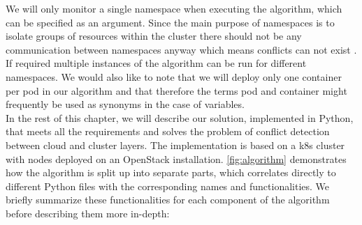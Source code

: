 We will only monitor a single namespace when executing the algorithm, which can be specified as an argument. Since the main purpose of namespaces is to isolate groups of resources within the cluster there should not be any communication between namespaces anyway which means conflicts can not exist \cite{namespace}. If required multiple instances of the algorithm can be run for different namespaces. We would also like to note that we will deploy only one container per pod in our algorithm and that therefore the terms pod and container might frequently be used as synonyms in the case of variables.
\\[10pt]

In the rest of this chapter, we will describe our solution, implemented in Python, that meets all the requirements and solves the problem of conflict detection between cloud and cluster layers. The implementation is based on a \acrshort{k8s} cluster with nodes deployed on an OpenStack installation. \autoref{fig:algorithm} demonstrates how the algorithm is split up into separate parts, which correlates directly to different Python files with the corresponding names and functionalities. We briefly summarize these functionalities for each component of the algorithm before describing them more in-depth:
